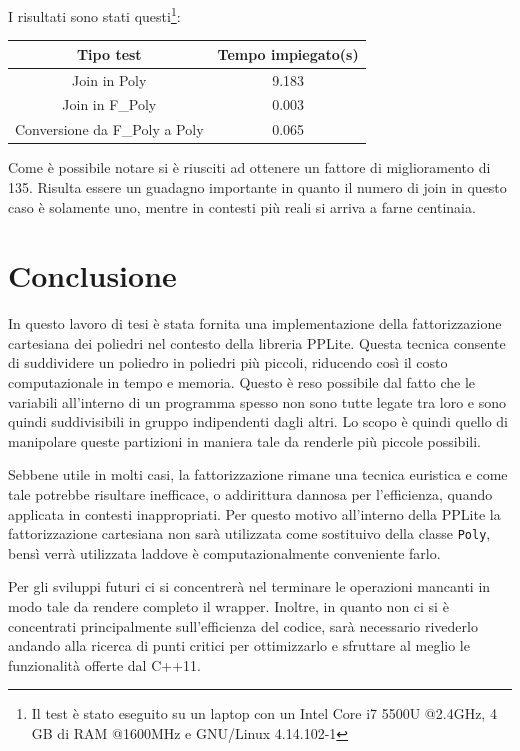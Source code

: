 \documentclass[italian]{mimosis}
\theoremstyle{definition}
\begin{document}
I risultati sono stati questi\footnote{Il test è stato eseguito su un laptop con un Intel Core i7 5500U
@2.4GHz, 4 GB di RAM @1600MHz e GNU/Linux 4.14.102-1}:
\begin{center}
\begin{tabular}{cc} \toprule
    \textbf{Tipo test} & \textbf{Tempo impiegato(s)}  \\ \midrule
    {Join in Poly}  & 9.183  \\
    {Join in F\_Poly}  & 0.003   \\
    {Conversione da F\_Poly a Poly}  & 0.065   \\ \bottomrule
\end{tabular}
\end{center}

Come è possibile notare si è riusciti ad ottenere un fattore di miglioramento
di 135. Risulta essere un guadagno importante in quanto il numero di join in
questo caso è solamente uno, mentre in contesti più reali si arriva a farne centinaia.
\chapter{Conclusione}
\label{sec:orge15e533}
In questo lavoro di tesi è stata fornita una implementazione della
fattorizzazione cartesiana dei poliedri nel contesto della libreria PPLite.
Questa tecnica consente di suddividere un poliedro in poliedri più piccoli, riducendo così il
costo computazionale in tempo e memoria. Questo è reso possibile dal fatto che
le variabili all'interno di un programma spesso non sono tutte legate tra loro e
sono quindi suddivisibili in gruppo indipendenti dagli altri. Lo scopo è quindi
quello di manipolare queste partizioni in maniera tale da renderle più piccole
possibili.

Sebbene utile in molti casi, la fattorizzazione rimane una tecnica euristica
e come tale potrebbe risultare inefficace, o addirittura dannosa per
l'efficienza, quando applicata in contesti inappropriati. Per questo motivo
all'interno della PPLite la fattorizzazione cartesiana non sarà utilizzata come
sostituivo della classe \texttt{Poly}, bensì verrà utilizzata laddove è
computazionalmente conveniente farlo.

Per gli sviluppi futuri ci si concentrerà nel terminare le operazioni mancanti
in modo tale da rendere completo il wrapper. Inoltre, in quanto non ci si è
concentrati principalmente sull'efficienza del codice, sarà necessario rivederlo
andando alla ricerca di punti critici per ottimizzarlo e sfruttare al
meglio le funzionalità offerte dal C++11.


\renewcommand\bibname{Bibliografia}

\end{document}
